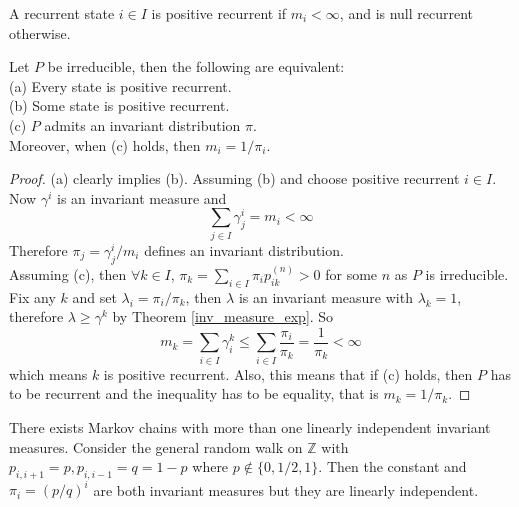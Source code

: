 \begin{definition}
    A recurrent state $i\in I$ is positive recurrent if $m_i<\infty$, and is null recurrent otherwise.
\end{definition}
\begin{theorem}
    Let $P$ be irreducible, then the following are equivalent:\\
    (a) Every state is positive recurrent.\\
    (b) Some state is positive recurrent.\\
    (c) $P$ admits an invariant distribution $\pi$.\\
    Moreover, when (c) holds, then $m_i=1/\pi_i$.
\end{theorem}
\begin{proof}
    (a) clearly implies (b).
    Assuming (b) and choose positive recurrent $i\in I$.
    Now $\gamma^i$ is an invariant measure and
    $$\sum_{j\in I}\gamma_j^i=m_i<\infty$$
    Therefore $\pi_j=\gamma_j^i/m_i$ defines an invariant distribution.\\
    Assuming (c), then $\forall k\in I$, $\pi_k=\sum_{i\in I}\pi_ip_{ik}^{(n)}>0$ for some $n$ as $P$ is irreducible.
    Fix any $k$ and set $\lambda_i=\pi_i/\pi_k$, then $\lambda$ is an invariant measure with $\lambda_k=1$, therefore $\lambda\ge\gamma^k$ by Theorem \ref{inv_measure_exp}.
    So
    $$m_k=\sum_{i\in I}\gamma_i^k\le\sum_{i\in I}\frac{\pi_i}{\pi_k}=\frac{1}{\pi_k}<\infty$$
    which means $k$ is positive recurrent.
    Also, this means that if (c) holds, then $P$ has to be recurrent and the inequality has to be equality, that is $m_k=1/\pi_k$.
\end{proof}
\begin{example}
    There exists Markov chains with more than one linearly independent invariant measures.
    Consider the general random walk on $\mathbb Z$ with $p_{i,i+1}=p,p_{i,i-1}=q=1-p$ where $p\notin \{0,1/2,1\}$.
    Then the constant and $\pi_i=(p/q)^i$ are both invariant measures but they are linearly independent.
\end{example}